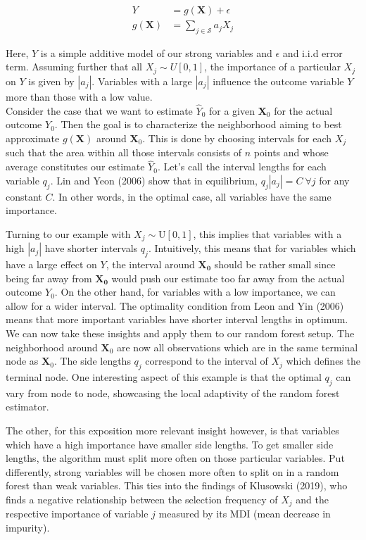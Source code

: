 {\begin{align*}
    Y &= g(\mathbf{X}) + \epsilon \\
    g(\mathbf{X}) &= \sum_{j \in \mathcal{S}} a_j X_j
\end{align*}

Here, $Y$ is a simple additive model of our strong variables and $\epsilon$ and i.i.d error term. 
Assuming further that all $X_j \sim U[0, 1]$, the importance of a particular $X_j$ on $Y$ is given by $|a_j|$. Variables with a large $|a_j|$ influence the outcome variable $Y$ more than those with a low value. \\


Consider the case that we want to estimate $\hat{Y}_0$ for a given $\mathbf{X}_0$ for the actual outcome $Y_0$. 
Then the goal is to characterize the neighborhood aiming to best approximate $g(\mathbf{X})$ around $\mathbf{X}_0$. 
This is done by choosing intervals for each $X_j$ such that the area within all those intervals consists of $n$ points and whose average constitutes our estimate $\hat{Y}_0$. 
Let's call the interval lengths for each variable $q_j$. Lin and Yeon (2006) show that in equilibrium, $q_j |a_j| = C \ \forall j$ for any constant $C$. 
In other words, in the optimal case, all variables have the same importance. 

Turning to our example with $X_j \sim \text{U}[0, 1]$, this implies that variables with a high $|a_j|$ have shorter intervals $q_j$. 
Intuitively, this means that for variables which have a large effect on $Y$, the interval around $\mathbf{X_0}$ should be rather small since being far away from $\mathbf{X_0}$ would push our estimate too far away from the actual outcome $Y_0$. 
On the other hand, for variables with a low importance, we can allow for a wider interval. 
The optimality condition from Leon and Yin (2006) means that more important variables have shorter interval lengths in optimum. \\

We can now take these insights and apply them to our random forest setup.
The neighborhood around $\mathbf{X}_0$ are now all observations which are in the same terminal node as $\mathbf{X}_0$. 
The side lengths $q_j$ correspond to the interval of $X_j$ which defines the terminal node. 
One interesting aspect of this example is that the optimal $q_j$ can vary from node to node, showcasing the local adaptivity of the random forest estimator.

The other, for this exposition more relevant insight however, is that variables which have a high importance have smaller side lengths. 
To get smaller side lengths, the algorithm must split more often on those particular variables. 
Put differently, strong variables will be chosen more often to split on in a random forest than weak  variables. 
This ties into the findings of Klusowski (2019), who finds a negative relationship between the selection frequency of $X_j$ and the respective importance of variable $j$ measured by its MDI (mean decrease in impurity). \\

}
